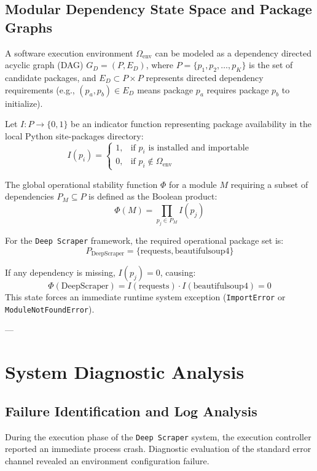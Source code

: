 \documentclass{article}
\begin{document}
\subsection{Modular Dependency State Space and Package Graphs}
A software execution environment $\Omega_{\text{env}}$ can be modeled as a dependency directed acyclic graph (DAG) $G_D = (P, E_D)$, where $P = \{p_1, p_2, \dots, p_K\}$ is the set of candidate packages, and $E_D \subset P \times P$ represents directed dependency requirements (e.g., $(p_a, p_b) \in E_D$ means package $p_a$ requires package $p_b$ to initialize).

Let $I: P \to \{0, 1\}$ be an indicator function representing package availability in the local Python site-packages directory:
\begin{equation}
I(p_i) = \begin{cases} 
1, & \text{if } p_i \text{ is installed and importable} \\
0, & \text{if } p_i \notin \Omega_{\text{env}} 
\end{cases}
\end{equation}

The global operational stability function $\Phi$ for a module $M$ requiring a subset of dependencies $P_M \subseteq P$ is defined as the Boolean product:
\begin{equation}
\Phi(M) = \prod_{p_j \in P_M} I(p_j)
\end{equation}

For the \texttt{Deep Scraper} framework, the required operational package set is:
\begin{equation}
P_{\text{DeepScraper}} = \{\text{requests}, \text{beautifulsoup4}\}
\end{equation}

If any dependency is missing, $I(p_j) = 0$, causing:
\begin{equation}
\Phi(\text{DeepScraper}) = I(\text{requests}) \cdot I(\text{beautifulsoup4}) = 0
\end{equation}
This state forces an immediate runtime system exception (\texttt{ImportError} or \texttt{ModuleNotFoundError}).

---

\section{System Diagnostic Analysis}

\subsection{Failure Identification and Log Analysis}
During the execution phase of the \texttt{Deep Scraper} system, the execution controller reported an immediate process crash. Diagnostic evaluation of the standard error channel revealed an environment configuration failure.
\end{document}
